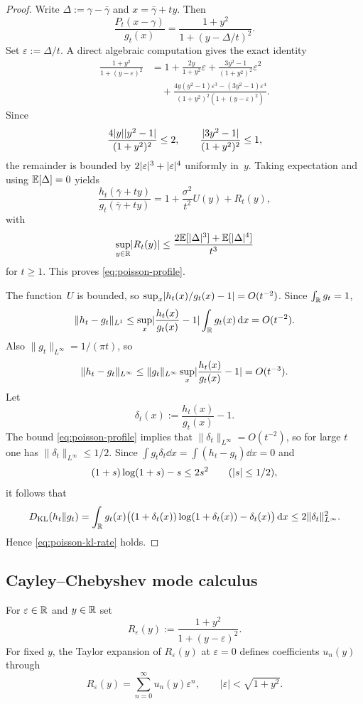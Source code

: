 \begin{proof}
Write $\Delta:=\gamma-\bar\gamma$ and $x=\bar\gamma+ty$.  Then
\[
\frac{P_t(x-\gamma)}{g_t(x)}
=\frac{1+y^{2}}{1+(y-\Delta/t)^{2}}.
\]
Set $\varepsilon:=\Delta/t$.  A direct algebraic computation gives the
exact identity
\begin{align*}
\frac{1+y^{2}}{1+(y-\varepsilon)^{2}}
&=1+\frac{2y}{1+y^{2}}\varepsilon
+\frac{3y^{2}-1}{(1+y^{2})^{2}}\varepsilon^{2} \\
&\quad
+\frac{4y(y^{2}-1)\varepsilon^{3}-(3y^{2}-1)\varepsilon^{4}}
{(1+y^{2})^{2}(1+(y-\varepsilon)^{2})}.
\end{align*}
Since
\[
\frac{4\lvert y\rvert\lvert y^{2}-1\rvert}{(1+y^{2})^{2}}\le 2,
\qquad
\frac{\lvert 3y^{2}-1\rvert}{(1+y^{2})^{2}}\le 1,
\]
the remainder is bounded by $2\lvert \varepsilon\rvert^{3}+\lvert \varepsilon\rvert^{4}$
uniformly in~$y$.  Taking expectation and using $\mathbb{E}[\Delta]=0$ yields
\[
\frac{h_t(\bar\gamma+ty)}{g_t(\bar\gamma+ty)}
=1+\frac{\sigma^{2}}{t^{2}}U(y)+R_t(y),
\]
with
\[
\sup_{y\in\mathbb{R}}\lvert R_t(y)\rvert
\le \frac{2\mathbb{E}[\lvert \Delta\rvert^{3}]+\mathbb{E}[\lvert \Delta\rvert^{4}]}{t^{3}}
\]
for $t\ge 1$.  This proves \eqref{eq:poisson-profile}.

The function~$U$ is bounded, so
$\sup_x\lvert h_t(x)/g_t(x)-1\rvert=O(t^{-2})$.  Since $\int_{\mathbb{R}}g_t=1$,
\[
\|h_t-g_t\|_{L^1}
\le \sup_{x}\lvert \frac{h_t(x)}{g_t(x)}-1\rvert\int_{\mathbb{R}}g_t(x)\,\mathrm{d} x
=O(t^{-2}).
\]
Also $\|g_t\|_{L^\infty}=1/(\pi t)$, so
\[
\|h_t-g_t\|_{L^\infty}
\le \|g_t\|_{L^\infty}\sup_{x}\lvert \frac{h_t(x)}{g_t(x)}-1\rvert
=O(t^{-3}).
\]
Let
\[
\delta_t(x):=\frac{h_t(x)}{g_t(x)}-1.
\]
The bound \eqref{eq:poisson-profile} implies that
$\|\delta_t\|_{L^\infty}=O(t^{-2})$, so for large $t$ one has
$\|\delta_t\|_{L^\infty}\le 1/2$.  Since
$\int g_t\delta_t\dd x=\int(h_t-g_t)\dd x=0$ and
\[
(1+s)\log(1+s)-s\le 2s^{2}
\qquad(\lvert s\rvert\le 1/2),
\]
it follows that
\[
D_{\mathrm{KL}}(h_t\|g_t)
=\int_{\mathbb{R}}g_t(x)\bigl((1+\delta_t(x))\log(1+\delta_t(x))-\delta_t(x)\bigr)\,\mathrm{d} x
\le 2\|\delta_t\|_{L^\infty}^{2}.
\]
Hence \eqref{eq:poisson-kl-rate} holds.
\end{proof}

\subsection{Cayley--Chebyshev mode calculus}

For $\varepsilon\in\mathbb{R}$ and $y\in\mathbb{R}$ set
\begin{equation}\label{eq:cayley-comparison-kernel}
R_\varepsilon(y):=\frac{1+y^2}{1+(y-\varepsilon)^2}.
\end{equation}
For fixed $y$, the Taylor expansion of $R_\varepsilon(y)$ at
$\varepsilon=0$ defines coefficients $u_n(y)$ through
\begin{equation}\label{eq:cayley-mode-series}
R_\varepsilon(y)=\sum_{n=0}^{\infty}u_n(y)\varepsilon^n,
\qquad
|\varepsilon|<\sqrt{1+y^2}.
\end{equation}

